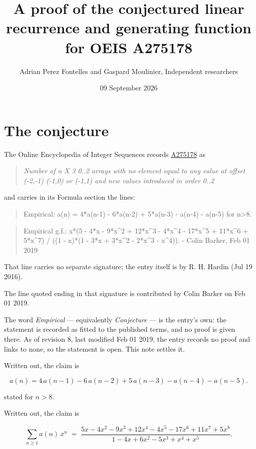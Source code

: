 \documentclass[11pt]{article}
\title{A proof of the conjectured linear recurrence and generating function for OEIS A275178}
\author{Adrian Perez Fontelles and Gaspard Moulinier, Independent researchers}
\date{09 September 2026}
\theoremstyle{definition}
\begin{document}
\maketitle
\section{The conjecture}

The Online Encyclopedia of Integer Sequences records \href{https://oeis.org/A275178}{A275178} as

\begin{quote}\itshape Number of n X 3 0..2 arrays with no element equal to any value at offset (-2,-1) (-1,0) or (-1,1) and new values introduced in order 0..2\end{quote}

and carries in its Formula section the lines:

\begin{quote}\ttfamily Empirical: a(n) = 4*a(n-1) - 6*a(n-2) + 5*a(n-3) - a(n-4) - a(n-5) for n>8.\end{quote}

\begin{quote}\ttfamily Empirical g.f.: x*(5 - 4*x - 9*x\textasciicircum{}2 + 12*x\textasciicircum{}3 - 4*x\textasciicircum{}4 - 17*x\textasciicircum{}5 + 11*x\textasciicircum{}6 + 5*x\textasciicircum{}7) / ((1 - x)*(1 - 3*x + 3*x\textasciicircum{}2 - 2*x\textasciicircum{}3 - x\textasciicircum{}4)). - Colin Barker, Feb 01 2019\end{quote}

That line carries no separate signature; the entry itself is by R. H. Hardin (Jul 19 2016).

The line quoted ending in that signature is contributed by Colin Barker on Feb 01 2019.

The word {\itshape Empirical} --- equivalently {\itshape Conjecture} --- is the entry's own: the statement is recorded as fitted to the published terms, and no proof is given there. As of revision 8, last modified Feb 01 2019, the entry records no proof and links to none, so the statement is open. This note settles it.

Written out, the claim is

\[a(n) = 4\,a(n-1) - 6\,a(n-2) + 5\,a(n-3) - a(n-4) - a(n-5).\]

stated for $n > 8$.

Written out, the claim is

\[\sum_{n \ge 1} a(n)\,x^n \;=\; \frac{5x - 4x^{2} - 9x^{3} + 12x^{4} - 4x^{5} - 17x^{6} + 11x^{7} + 5x^{8}}{1 - 4x + 6x^{2} - 5x^{3} + x^{4} + x^{5}}.\]
\end{document}
